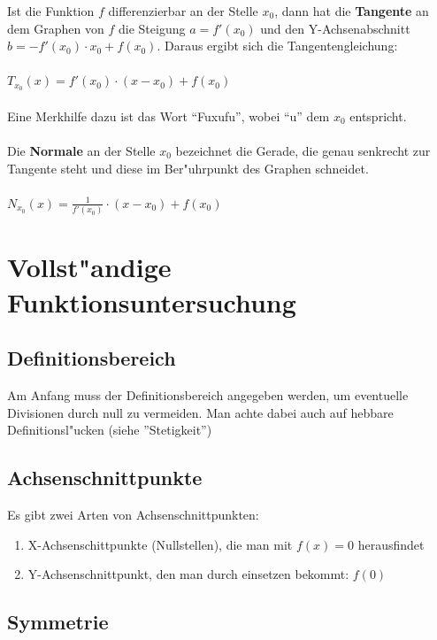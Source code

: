 Ist die Funktion $f$ differenzierbar an der Stelle $x_{0}$, dann hat die \textbf{Tangente} an dem Graphen von $f$ die Steigung $a=f'(x_{0})$ und den Y-Achsenabschnitt $b=-f'(x_{0})\cdot x_{0}+f(x_{0})$. Daraus ergibt sich die Tangentengleichung:\\
\\
$T_{x_{0}}(x)=f'(x_{0})\cdot (x-x_{0})+f(x_{0}) $ \\
\\
Eine Merkhilfe dazu ist das Wort "`Fuxufu"', wobei "`u"' dem $x_{0}$ entspricht.\\
\\
Die \textbf{Normale} an der Stelle $x_{0}$ bezeichnet die Gerade, die genau senkrecht zur Tangente steht und diese im Ber"uhrpunkt des Graphen schneidet.\\
\\
$N_{x_{0}}(x)=\frac{1}{f'(x_{0})}\cdot (x-x_{0})+f(x_{0})$\\


\section{Vollst"andige Funktionsuntersuchung}


\subsection{Definitionsbereich}

Am Anfang muss der Definitionsbereich angegeben werden, um eventuelle Divisionen durch null zu vermeiden. Man achte dabei auch auf hebbare Definitionsl"ucken (siehe ''Stetigkeit'') \\


\subsection{Achsenschnittpunkte}

Es gibt zwei Arten von Achsenschnittpunkten:
\begin{enumerate}
\item X-Achsenschittpunkte (Nullstellen), die man mit $f(x)=0$ herausfindet
\item Y-Achsenschnittpunkt, den man durch einsetzen bekommt: $f(0)$ \\
\end{enumerate}

\subsection{Symmetrie}

